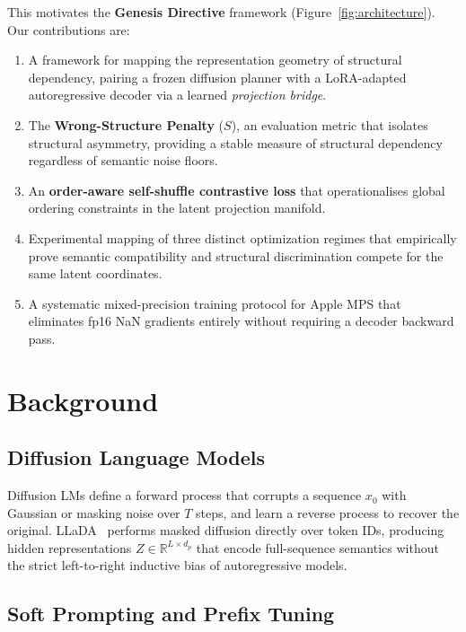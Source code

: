 \documentclass[11pt]{article}
\begin{document}
This motivates the \textbf{Genesis Directive} framework
(Figure~\ref{fig:architecture}).
Our contributions are:

\begin{enumerate}
  \item A framework for mapping the representation geometry of structural dependency, pairing a frozen diffusion planner with a LoRA-adapted autoregressive decoder via a learned \emph{projection bridge}.
  \item The \textbf{Wrong-Structure Penalty} ($S$), an evaluation metric that isolates structural asymmetry, providing a stable measure of structural dependency regardless of semantic noise floors.
  \item An \textbf{order-aware self-shuffle contrastive loss} that operationalises global ordering constraints in the latent projection manifold.
  \item Experimental mapping of three distinct optimization regimes that empirically prove semantic compatibility and structural discrimination compete for the same latent coordinates.
  \item A systematic mixed-precision training protocol for Apple MPS that eliminates fp16 NaN gradients entirely without requiring a decoder backward pass.
\end{enumerate}

\section{Background}
\label{sec:background}

\subsection{Diffusion Language Models}

Diffusion LMs define a forward process that corrupts a sequence $x_0$ with
Gaussian or masking noise over $T$ steps, and learn a reverse process to
recover the original.
LLaDA~\citep{nie2025llada} performs masked diffusion directly over token IDs,
producing hidden representations $Z \in \mathbb{R}^{L \times d_p}$ that encode
full-sequence semantics without the strict left-to-right inductive bias of
autoregressive models.

\subsection{Soft Prompting and Prefix Tuning}
\end{document}
